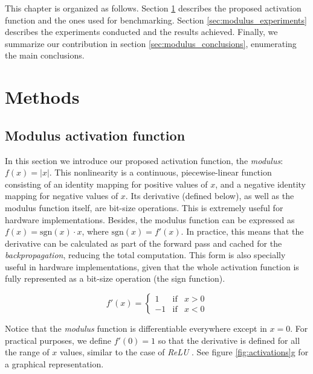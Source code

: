 This chapter is organized as follows. Section \ref{sec:modulus_methods} describes the proposed activation function and the ones used for benchmarking. Section \ref{sec:modulus_experiments} describes the experiments conducted and the results achieved. Finally, we summarize our contribution in section \ref{sec:modulus_conclusions}, enumerating the main conclusions.



\section{Methods} \label{sec:modulus_methods}
\subsection{Modulus activation function}
In this section we introduce our proposed activation function, the \textit{modulus}: $f(x)=|x|$. This nonlinearity is a continuous, piecewise-linear function consisting of an identity mapping for positive values of $x$, and a negative identity mapping for negative values of $x$. Its derivative (defined below), as well as the modulus function itself, are bit-size operations. This is extremely useful for hardware implementations. Besides, the modulus function can be expressed as $f(x) = \text{sgn}(x)\cdot x$, where $\text{sgn}(x) = f'(x)$. In practice, this means that the derivative can be calculated as part of the forward pass and cached for the \textit{backpropagation}, reducing the total computation. This form is also specially useful in hardware implementations, given that the whole activation function is fully represented as a bit-size operation (the sign function).

$$
f'(x)= \left\{ \begin{array}{lcc}
1 &   \text{if}  & x > 0 \\
-1 &  \text{if} & x < 0
\end{array} \right.
$$

Notice that the \textit{modulus} function is differentiable everywhere except in $x = 0$. For practical purposes, we define $f'(0) = 1$ so that the derivative is defined for all the range of $x$ values, similar to the case of \textit{ReLU} \autocite{Goodfellow2016}. See figure \ref{fig:activations}g for a graphical representation.


